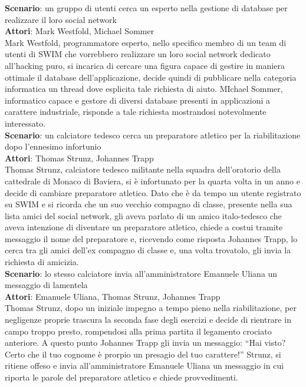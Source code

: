 \documentclass[a4paper,12pt]{article}
\begin{document}
\textbf{Scenario}: un gruppo di utenti cerca un esperto nella gestione di database per realizzare il loro social network \\
\textbf{Attori}: Mark Westfold, Michael Sommer \\
Mark Westfold, programmatore esperto, nello specifico membro di un team di utenti di SWIM che vorrebbero realizzare un loro social network dedicato all'hacking puro, si incarica di cercare una figura capace di gestire in maniera ottimale il database dell'applicazione, decide quindi di pubblicare nella categoria informatica un thread dove esplicita tale richiesta di aiuto. MIchael Sommer, informatico capace e gestore di diversi database presenti in applicazioni a carattere industriale, risponde a tale richiesta mostrandosi notevolmente interessato.    \\[3em]
\textbf{Scenario}: un calciatore tedesco cerca un preparatore atletico per la riabilitazione dopo l'ennesimo infortunio \\
\textbf{Attori}: Thomas Strunz, Johannes Trapp \\
Thomas Strunz, calciatore tedesco militante nella squadra dell'oratorio della cattedrale di Monaco di Baviera, si è infortunato per la quarta volta in un anno e decide di cambiare preparatore atletico. Dato che è da tempo un utente registrato su SWIM e si ricorda che un suo vecchio compagno di classe, presente nella sua lista amici del social network, gli aveva parlato di un amico italo-tedesco che aveva intenzione di diventare un preparatore atletico, chiede a costui tramite messaggio il nome del preparatore e, ricevendo come risposta Johannes Trapp, lo cerca tra gli amici dell'ex compagno di classe e, una volta trovatolo, gli invia la richiesta di amicizia. \\[1.5em]
\textbf{Scenario}: lo stesso calciatore invia all'amministratore Emanuele Uliana un messaggio di lamentela \\
\textbf{Attori}: Emanuele Uliana, Thomas Strunz, Johannes Trapp \\
Thomas Strunz, dopo un iniziale impegno a tempo pieno nella riabilitazione, per negligenze proprie trascura la seconda fase degli esercizi e decide di rientrare in campo troppo presto, rompendosi alla prima partita il legamento crociato anteriore. A questo punto Johannes Trapp gli invia un messaggio: “Hai visto? Certo che il tuo cognome è prorpio un presagio del tuo carattere!” Strunz, si ritiene offeso e invia all'amministratore Emanuele Uliana un messaggio in cui riporta le parole del preparatore atletico e chiede provvedimenti. \\[1.5em]
\end{document}

